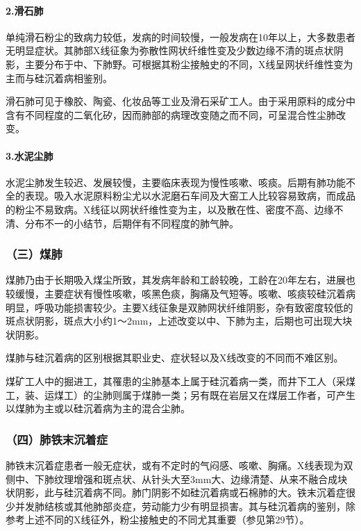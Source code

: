 \paragraph{2.滑石肺}

单纯滑石粉尘的致病力较低，发病的时间较慢，一般发病在10年以上，大多数患者无明显症状。其肺部X线征象为弥散性网状纤维性变及少数边缘不清的斑点状阴影，主要分布于中、下肺野。可根据其粉尘接触史的不同，X线呈网状纤维性变为主而与硅沉着病相鉴别。

滑石肺可见于橡胶、陶瓷、化妆品等工业及滑石采矿工人。由于采用原料的成分中含有不同程度的二氧化矽，因而肺部的病理改变随之而不同，可呈混合性尘肺改变。

\paragraph{3.水泥尘肺}

水泥尘肺发生较迟、发展较慢，主要临床表现为慢性咳嗽、咳痰。后期有肺功能不全的表现。吸入水泥原料粉尘尤以水泥磨石车间及大窑工人比较容易致病，而成品的粉尘不易致病。X线征以网状纤维性变为主，以及散在性、密度不高、边缘不清、分布不一的小结节，后期伴有不同程度的肺气肿。

\subsubsection{（三）煤肺}

煤肺乃由于长期吸入煤尘所致，其发病年龄和工龄较晚，工龄在20年左右，进展也较缓慢，主要症状有慢性咳嗽，咳黑色痰，胸痛及气短等。咳嗽、咳痰较硅沉着病明显，呼吸功能损害较少。主要X线征象是双肺网状纤维阴影，杂有致密度较低的斑点状阴影，斑点大小约1～2mm，上述改变以中、下肺为主，后期也可出现大块状阴影。

煤肺与硅沉着病的区别根据其职业史、症状轻以及X线改变的不同而不难区别。

煤矿工人中的掘进工，其罹患的尘肺基本上属于硅沉着病一类，而井下工人（采煤工，装、运煤工）的尘肺则属于煤肺一类；另有既在岩层又在煤层工作者，可产生以煤肺为主或以硅沉着病为主的混合尘肺。

\subsubsection{（四）肺铁末沉着症}

肺铁末沉着症患者一般无症状，或有不定时的气闷感、咳嗽、胸痛。X线表现为双侧中、下肺纹理增强和斑点状、从针头大至3mm大、边缘清楚、从来不融合成块状阴影，此与硅沉着病不同。肺门阴影不如硅沉着病或石棉肺的大。铁末沉着症很少并发肺结核或其他肺部炎症，劳动能力少有明显损害。其与硅沉着病的鉴别，除参考上述不同的X线征外，粉尘接触史的不同尤其重要（参见第29节）。

